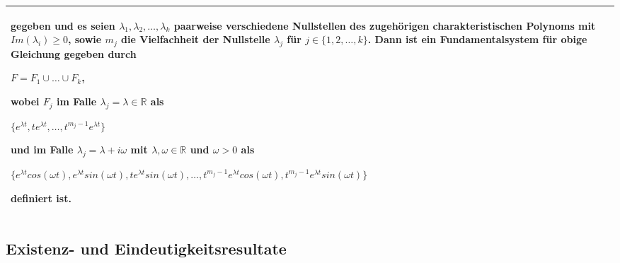 \begin{table}[H]
\begin{tabularx}{\textwidth}{X m{16cm}}
                gegeben und es seien $\lambda_1,\lambda_2,\dots,\lambda_k$ paarweise verschiedene Nullstellen des zugehörigen charakteristischen
                Polynoms mit $Im(\lambda_i) \geq 0$, sowie $m_j$ die Vielfachheit der Nullstelle $\lambda_j$ für $j \in \{1,2,\dots,k\}$. \hfill \break
                Dann ist ein Fundamentalsystem für obige Gleichung gegeben durch \hfill \break
                \centerline{$ F = F_1 \cup \dots \cup F_k $,}
                wobei $F_j$ im Falle $\lambda_j = \lambda \in \mathbb{R}$ als \hfill \break
                \centerline{$ \{e^{\lambda t},te^{\lambda t},\dots,t^{m_j-1}e^{\lambda t} \} $}
                und im Falle $\lambda_j = \lambda + i\omega$ mit $\lambda, \omega\in \mathbb{R}$ und $\omega > 0$ als \hfill \break
                \centerline{$ \{ e^{\lambda t}cos(\omega t), e^{\lambda t}sin(\omega t), te^{\lambda t}sin(\omega t), \dots,
                t^{m_j-1}e^{\lambda t}cos(\omega t),  t^{m_j-1}e^{\lambda t}sin(\omega t)\} $}
                definiert ist. \\


        \bottomrule
    \end{tabularx}
    \end{table}

    \pagebreak

\subsection{Existenz- und Eindeutigkeitsresultate}

